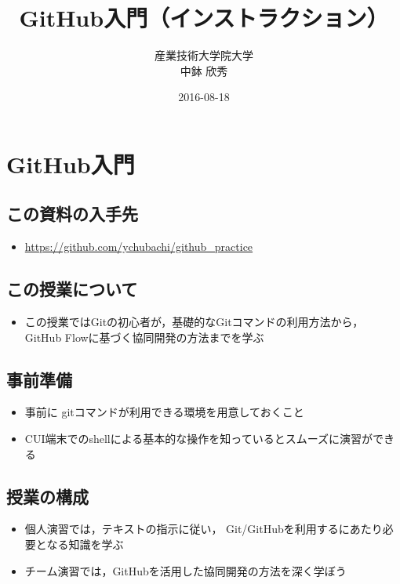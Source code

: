 \documentclass[a4paper,twoside,twocolumn]{bxjsarticle}
\author{産業技術大学院大学\\ 中鉢 欣秀}
\date{2016-08-18}
\title{GitHub入門（インストラクション）}
\begin{document}
\maketitle

\section{GitHub入門}
\label{sec-1}
\subsection{この資料の入手先}
\label{sec-1-1}
\begin{itemize}
\item \url{https://github.com/ychubachi/github_practice}
\end{itemize}

\subsection{この授業について}
\label{sec-1-2}
\begin{itemize}
\item この授業ではGitの初心者が，基礎的なGitコマンドの利用方法から，
GitHub Flowに基づく協同開発の方法までを学ぶ
\end{itemize}

\subsection{事前準備}
\label{sec-1-3}
\begin{itemize}
\item 事前に gitコマンドが利用できる環境を用意しておくこと
\item CUI端末でのshellによる基本的な操作を知っているとスムーズに演習ができる
\end{itemize}

\subsection{授業の構成}
\label{sec-1-4}
\begin{itemize}
\item 個人演習では，テキストの指示に従い，
Git/GitHubを利用するにあたり必要となる知識を学ぶ
\item チーム演習では，GitHubを活用した協同開発の方法を深く学ぼう
\end{itemize}
\end{document}
